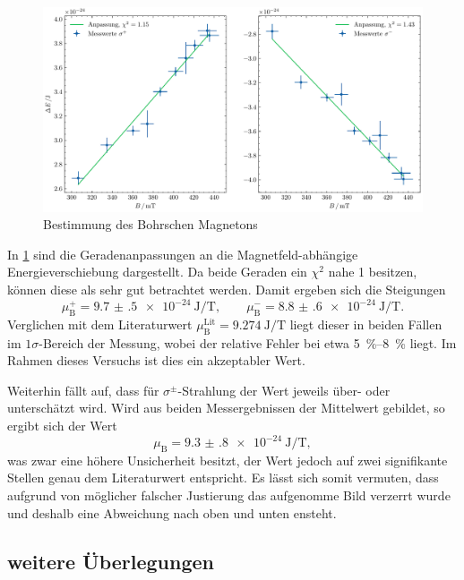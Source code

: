 \begin{figure}[htb]
    \centering
    \includegraphics[width=0.9\linewidth]{../figs/magneton}
    \caption{Bestimmung des Bohrschen Magnetons}
    \label{fig:bohr_magneton}
\end{figure}

In \cref{fig:bohr_magneton} sind die Geradenanpassungen an die Magnetfeld-abhängige 
Energieverschiebung dargestellt. Da beide Geraden ein $\chi^2$ nahe 1 
besitzen, können diese als sehr gut betrachtet werden. Damit ergeben sich die Steigungen 
\begin{equation}
    \mu_\mathrm B^+ = \SI{9.7(5)e-24}{\joule\per\tesla}, 
    \qquad \mu_\mathrm B^- = \SI{8.8(6)e-24}{\joule\per\tesla}
    \label{eq:magneton_exp}.
\end{equation}
Verglichen mit dem Literaturwert $\mu_\mathrm B^\mathrm{Lit} = \SI{9.274}{\joule\per\tesla}$
liegt dieser in beiden Fällen im $1\sigma$-Bereich der Messung, wobei der relative 
Fehler bei etwa \qtyrange{5}{8}{\percent} liegt. Im Rahmen dieses Versuchs 
ist dies ein akzeptabler Wert. 

Weiterhin fällt auf, dass für $\sigma^\pm$-Strahlung der Wert jeweils über- oder unterschätzt 
wird. Wird aus beiden Messergebnissen der Mittelwert gebildet, so ergibt sich der 
Wert 
\begin{equation*}
    \mu_\mathrm B = \SI{9.3(8)e-24}{\joule\per\tesla},
\end{equation*}
was zwar eine höhere Unsicherheit besitzt, der Wert jedoch auf zwei signifikante Stellen 
genau dem Literaturwert entspricht. Es lässt sich somit vermuten, dass aufgrund 
von möglicher falscher Justierung das aufgenomme Bild verzerrt wurde und deshalb 
eine Abweichung nach oben und unten ensteht.

\subsection{weitere Überlegungen}
